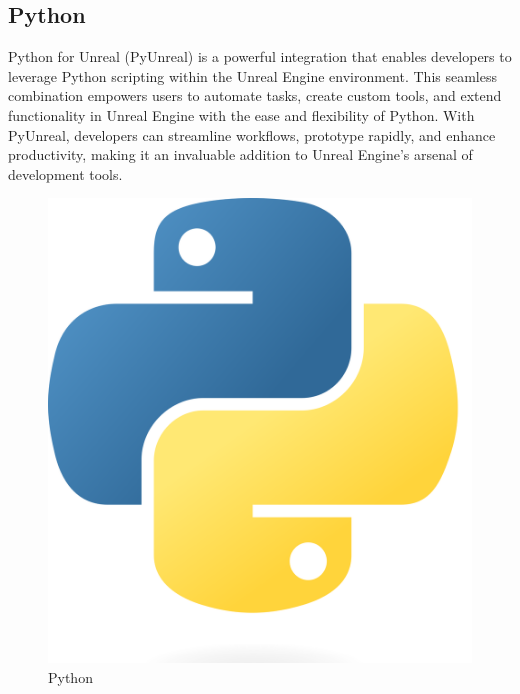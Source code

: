 \documentclass[12pt]{book}
\begin{document}
\subsection{Python}
Python for Unreal (PyUnreal) is a powerful integration that enables developers to leverage Python scripting within the Unreal Engine
environment. This seamless combination empowers users to automate tasks, create custom tools, and extend functionality in Unreal
Engine with the ease and flexibility of Python. With PyUnreal, developers can streamline workflows, prototype rapidly, and enhance
productivity, making it an invaluable addition to Unreal Engine's arsenal of development tools.
\begin{figure}[!h]
    \centering
    \includegraphics[scale=0.04]{./Figures/Images/Python.png}
    \caption{Python}
    \label{Python}
\end{figure}
\end{document}

